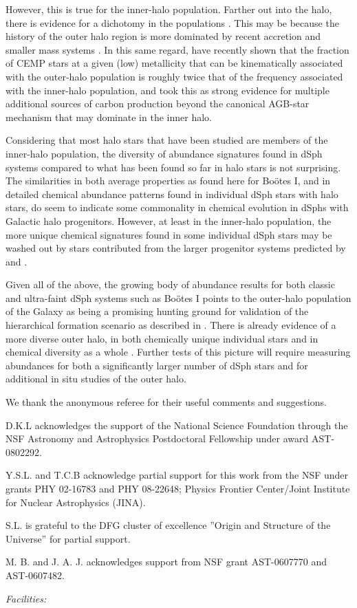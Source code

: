 \documentclass[iop]{emulateapj}
\def\bootes{Bo\"{o}tes I}
\begin{document}
However, this is true for the inner-halo population. Farther out into
the halo, there is evidence for a dichotomy in the populations
\citep{carollo07,carollo10}. This may be because the history of the
outer halo region is more dominated by recent accretion and smaller
mass systems \citep{bullock05}. In this same regard, \citet{carollo11}
have recently shown that the fraction of CEMP stars at a given (low)
metallicity that can be kinematically associated with the outer-halo
population is roughly twice that of the frequency associated with the
inner-halo population, and took this as strong evidence for multiple
additional sources of carbon production beyond the canonical AGB-star
mechanism that may dominate in the inner halo.

Considering that most halo stars that have been studied are members of
the inner-halo population, the diversity of abundance signatures found
in dSph systems compared to what has been found so far in halo stars
is not surprising. The similarities in both average properties as
found here for \bootes{}, and in detailed chemical abundance patterns
found in individual dSph stars with halo stars, do seem to indicate
some commonality in chemical evolution in dSphs with Galactic halo
progenitors. However, at least in the inner-halo population, the more
unique chemical signatures found in some individual dSph stars may be
washed out by stars contributed from the larger progenitor systems
predicted by \citet{robertson05} and \citet{font06}.

Given all of the above, the growing body of abundance results for both
classic and ultra-faint dSph systems such as \bootes{} points to the
outer-halo population of the Galaxy as being a promising hunting
ground for validation of the hierarchical formation scenario as
described in \citet{bullock05}. There is already evidence of a more
diverse outer halo, in both chemically unique individual stars
\citep{lai09} and in chemical diversity as a whole
\citep{roederer09}. Further tests of this picture will require
measuring abundances for both a significantly larger number of dSph
stars and for additional in situ studies of the outer halo.

\acknowledgements

We thank the anonymous referee for their useful comments and suggestions.

D.K.L acknowledges the support of the National Science Foundation through the NSF Astronomy
and Astrophysics Postdoctoral Fellowship under award AST-0802292.

Y.S.L. and T.C.B acknowledge partial support for this work from the NSF under
grants PHY 02-16783 and PHY 08-22648; Physics Frontier Center/Joint Institute
for Nuclear Astrophysics (JINA).

S.L. is grateful to the DFG cluster of excellence ''Origin and Structure of the Universe'' for partial support.

M. B. and J. A. J. acknowledges support from NSF grant AST-0607770 and
AST-0607482.


{\it Facilities:} 



\clearpage
\end{document}
